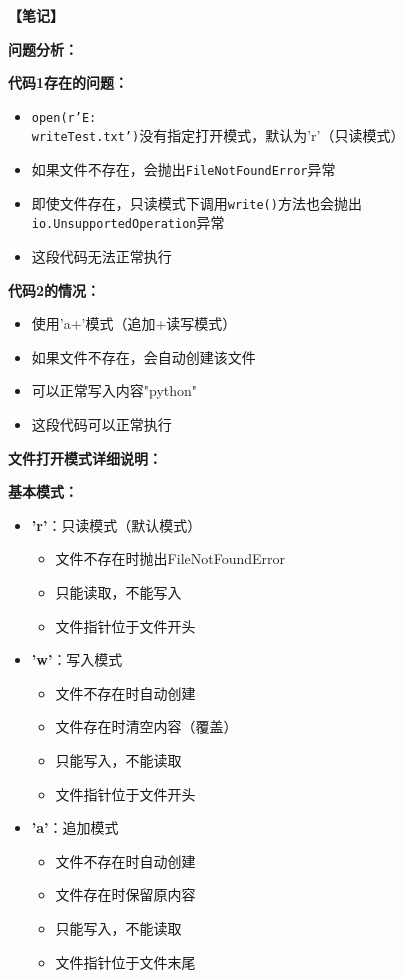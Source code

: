 \begin{mdframed}[linewidth=1pt, linecolor=black]

  \textbf{\color{red}【笔记】}

  \textbf{问题分析：}

  \textbf{代码1存在的问题：}
  \begin{itemize}
    \item \texttt{open(r'E:\\writeTest.txt')}没有指定打开模式，默认为'r'（只读模式）
    \item 如果文件不存在，会抛出\texttt{FileNotFoundError}异常
    \item 即使文件存在，只读模式下调用\texttt{write()}方法也会抛出\texttt{io.UnsupportedOperation}异常
    \item 这段代码无法正常执行
  \end{itemize}

  \textbf{代码2的情况：}
  \begin{itemize}
    \item 使用'a+'模式（追加+读写模式）
    \item 如果文件不存在，会自动创建该文件
    \item 可以正常写入内容"python"
    \item 这段代码可以正常执行
  \end{itemize}

  \textbf{文件打开模式详细说明：}

  \textbf{基本模式：}
  \begin{itemize}
    \item \textbf{'r'}：只读模式（默认模式）
      \begin{itemize}
        \item 文件不存在时抛出FileNotFoundError
        \item 只能读取，不能写入
        \item 文件指针位于文件开头
      \end{itemize}

    \item \textbf{'w'}：写入模式
      \begin{itemize}
        \item 文件不存在时自动创建
        \item 文件存在时清空内容（覆盖）
        \item 只能写入，不能读取
        \item 文件指针位于文件开头
      \end{itemize}

    \item \textbf{'a'}：追加模式
      \begin{itemize}
        \item 文件不存在时自动创建
        \item 文件存在时保留原内容
        \item 只能写入，不能读取
        \item 文件指针位于文件末尾
      \end{itemize}
  \end{itemize}


\end{mdframed}
